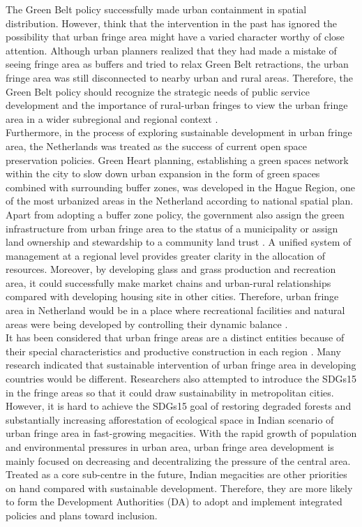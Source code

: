 The Green Belt policy successfully made urban containment in spatial distribution. However, \textcite{gant_land-use_2011} think that the intervention in the past has ignored the possibility that urban fringe area might have a varied character worthy of close attention. Although urban planners realized that they had made a mistake of seeing fringe area as buffers and tried to relax Green Belt retractions, the urban fringe area was still disconnected to nearby urban and rural areas. Therefore, the Green Belt policy should recognize the strategic needs of public service development and the importance of rural-urban fringes to view the urban fringe area in a wider subregional and regional context \parencite{gallent_representing_2007}.\\

Furthermore, in the process of exploring sustainable development in urban fringe area, the Netherlands was treated as the success of current open space preservation policies. Green Heart planning, establishing a green spaces network within the city to slow down urban expansion in the form of green spaces combined with surrounding buffer zones, was developed in the Hague Region, one of the most urbanized areas in the Netherland according to national spatial plan\parencite{koomen_impact_2013}. Apart from adopting a buffer zone policy, the government also assign the green infrastructure from urban fringe area to the status of a municipality or assign land ownership and stewardship to a community land trust \parencite{aalbers_analysis_2009}. A unified system of management at a regional level provides greater clarity in the allocation of resources. Moreover, by developing glass and grass production and recreation area, it could successfully make market chains and urban-rural relationships compared with developing housing site in other cities. Therefore, urban fringe area in Netherland would be in a place where recreational facilities and natural areas were being developed by controlling their dynamic balance \parencite{koomen_impact_2013}.\\

It has been considered that urban fringe areas are a distinct entities because of their special characteristics and productive construction in each region \parencite{gallent_ruralurban_2006}. Many research indicated that sustainable intervention of urban fringe area in developing countries would be different. Researchers also attempted to introduce the SDGs15 in the fringe areas so that it could draw sustainability in metropolitan cities. However, it is hard to achieve the SDGs15 goal of restoring degraded forests and substantially increasing afforestation of ecological space in Indian scenario of urban fringe area in fast-growing megacities\parencite{howlader_exploring_2020}. With the rapid growth of population and environmental pressures in urban area, urban fringe area development is mainly focused on decreasing and decentralizing the pressure of the central area. Treated as a core sub-centre in the future, Indian megacities are other priorities on hand compared with sustainable development. Therefore, they are more likely to form the Development Authorities (DA) to adopt and implement integrated policies and plans toward inclusion.\\

